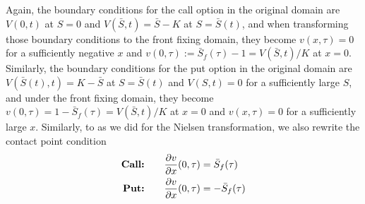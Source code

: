 Again, the boundary conditions for the call option in the original domain are
$V(0,t)$ at $S=0$ and $V(\bar{S}, t) = \bar{S} - K$  at $S=\bar{S}(t)$, and when transforming those boundary conditions to the front fixing domain, they become $v(x, \tau) = 0$ for a sufficiently negative $x$ and $v(0, \tau) := \bar{S}_f(\tau) - 1 = V(\bar{S}, t) / K$ at $x=0$. Similarly, the boundary conditions for the put option in the original domain are $V(\bar{S}(t), t) = K - \bar{S}$ at $S=\bar{S}(t)$ and $V(S, t) = 0$ for a sufficiently large $S$, and under the front fixing domain, they become $v(0, \tau) = 1 - \bar{S}_f(\tau) = V(\bar{S}, t) / K$ at $x=0$ and $v(x, \tau) = 0$ for a sufficiently large $x$. Similarly, to as we did for the Nielsen transformation, we also rewrite the contact point condition
\begin{subequations}
  \begin{align}
    \text{\textbf{Call:}} \qquad & \dfrac{\partial v}{\partial x}(0, \tau) =  \bar{S}_f(\tau)\\
    \text{\textbf{Put:}} \qquad & \dfrac{\partial v}{\partial x}(0, \tau) = -\bar{S}_f(\tau)
  \end{align}
\end{subequations}
